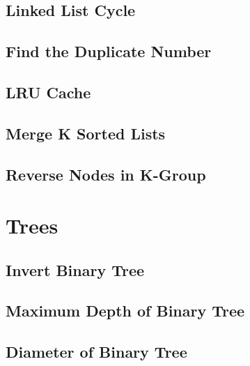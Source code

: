 \documentclass[12pt,letterpaper]{book}
\theoremstyle{definition}
\theoremstyle{remark}
\begin{document}

\section{Linked List Cycle}


\section{Find the Duplicate Number}


\section{LRU Cache}


\section{Merge K Sorted Lists}


\section{Reverse Nodes in K-Group}


\chapter{Trees}

\section{Invert Binary Tree}


\section{Maximum Depth of Binary Tree}


\section{Diameter of Binary Tree}
\end{document}
